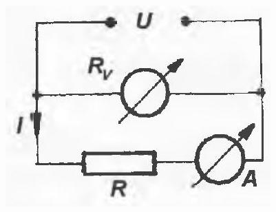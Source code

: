 \documentclass[10pt]{article}
\begin{document}
\includegraphics[max width=\textwidth, center]{2025_07_01_5b3ff9fa0d508c8e9f17g-159(1)}
\end{document}
